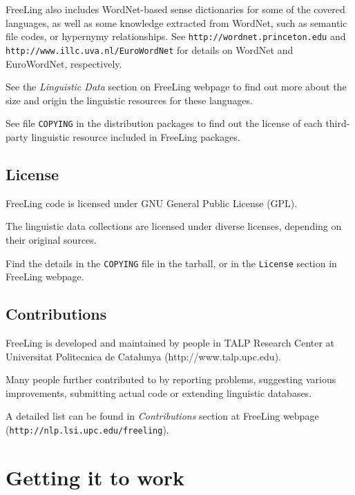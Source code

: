 \documentclass[a4paper]{book}
\begin{document}
 FreeLing also includes WordNet-based sense dictionaries for some of
the covered languages, as well as some knowledge extracted from
WordNet, such as semantic file codes, or hypernymy relationships.
See {\tt http://wordnet.princeton.edu} and {\tt http://www.illc.uva.nl/EuroWordNet}
for details on WordNet and EuroWordNet, respectively.

See the {\sl Linguistic Data} section on FreeLing webpage to find out more
about the size and origin the linguistic resources for these languages.

 See file \texttt{COPYING} in the distribution packages to find out 
the license of each third-party linguistic resource included in 
FreeLing packages.
   

\section{License}

\noindent FreeLing code is licensed under GNU General Public License
(GPL).
  
\noindent The linguistic data collections are licensed under diverse
licenses, depending on their original sources.

\noindent Find the details in the {\tt COPYING} file in the tarball, or in the
  {\tt License} section in FreeLing webpage.

\section{Contributions}
 
  FreeLing is developed and maintained by people in TALP Research 
  Center at Universitat Politecnica de Catalunya (http://www.talp.upc.edu). 

  Many people further contributed to by reporting problems, suggesting 
  various improvements, submitting actual code or extending linguistic 
  databases. 

  A detailed list can be found in {\sl Contributions} section at
  FreeLing webpage \\
  ({\tt http://nlp.lsi.upc.edu/freeling}).



\chapter{Getting it to work}
\end{document}

